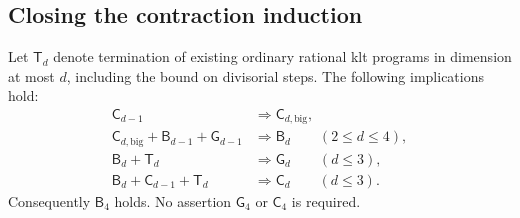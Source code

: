 \subsection{Closing the contraction induction}
\begin{proposition}
\label{repair:prop:restricted-bpf-induction}
Let $\mathsf T_d$ denote termination of existing ordinary rational
klt programs in dimension at most $d$, including the bound on
divisorial steps. The following implications hold:
\begin{align*}
 \mathsf C_{d-1}&\Longrightarrow\mathsf C_{d,\mathrm{big}},\\
 \mathsf C_{d,\mathrm{big}}+\mathsf B_{d-1}+\mathsf G_{d-1}
   &\Longrightarrow\mathsf B_d \qquad (2\leq d\leq4),\\
 \mathsf B_d+\mathsf T_d
   &\Longrightarrow\mathsf G_d \qquad (d\leq3),\\
 \mathsf B_d+\mathsf C_{d-1}+\mathsf T_d
   &\Longrightarrow\mathsf C_d \qquad (d\leq3).
\end{align*}
Consequently $\mathsf B_4$ holds. No assertion $\mathsf G_4$ or
$\mathsf C_4$ is required.
\end{proposition}

